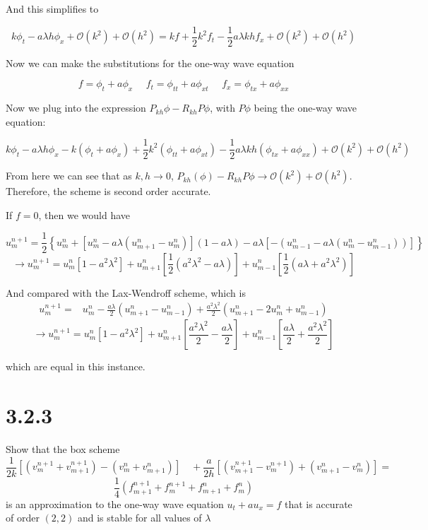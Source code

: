 \documentclass[12pt]{article}
\begin{document}
\noindent And this simplifies to

$$  k\phi_t - a\lambda h\phi_{x} + \mathcal{O}(k^2) + \mathcal{O}(h^2)= kf + \frac{1}{2}k^2f_t  - \frac{1}{2}a\lambda khf_x  + \mathcal{O}(k^2) + \mathcal{O}(h^2)$$

\noindent Now we can make the substitutions for the one-way wave equation

$$ f = \phi_t + a\phi_x ~~~~~~ f_t = \phi_{tt} + a\phi_{xt} ~~~~~~  f_x = \phi_{tx} + a\phi_{xx} $$

\noindent Now we plug into the expression $P_{kh}\phi - R_{kh}P\phi$, with $P\phi$ being the one-way wave equation:

$$  k\phi_t - a\lambda h\phi_{x} - k(\phi_t + a\phi_x) + \frac{1}{2}k^2(\phi_{tt} + a\phi_{xt})  - \frac{1}{2}a\lambda kh(\phi_{tx} + a\phi_{xx})  + \mathcal{O}(k^2) + \mathcal{O}(h^2)$$

\noindent From here we can see that as $k,h\to 0$, $P_{kh}(\phi) - R_{kh}P\phi\to \mathcal{O}(k^2) + \mathcal{O}(h^2)$. Therefore, the scheme is second order accurate.

If $f=0$, then we would have 

$$
u_{m}^{n+1}=\frac{1}{2}\left\{u_{m}^{n}+\left[u_{m}^{n}-a \lambda(u_{m+1}^{n}-u_{m}^{n})\right]   (1 - a\lambda)  -a \lambda\left[-(u_{m-1}^{n}-a \lambda(u_{m}^{n}-u_{m-1}^{n}))\right]\right\} 
$$
$$\longrightarrow u_m^{n+1} = 
    u_{m}^{n}\left[1-a^2\lambda^2\right] + 
    u_{m+1}^{n}\left[\frac{1}{2}(a^2\lambda^2 -a\lambda)\right] + 
    u_{m-1}^{n}\left[\frac{1}{2}(a\lambda + a^2\lambda^2)\right]  $$


\noindent And compared with the Lax-Wendroff scheme, which is
$$
\begin{aligned}
u_{m}^{n+1}=& u_{m}^{n}-\frac{a \lambda}{2}\left(u_{m+1}^{n}-u_{m-1}^{n}\right)+\frac{a^{2} \lambda^{2}}{2}\left(u_{m+1}^{n}-2 u_{m}^{n}+u_{m-1}^{n}\right)
\end{aligned}
$$
$$\longrightarrow u_m^{n+1} = u_m^n\left[1-a^2\lambda^2\right] + u_{m+1}^n\left[\frac{a^2\lambda^2}{2} - \frac{a\lambda}{2}\right] + u_{m-1}^n\left[\frac{a\lambda}{2} + \frac{a^2\lambda^2}{2}\right] $$

\noindent which are equal in this instance.

\section*{3.2.3}
Show that the box scheme
$$
\frac{1}{2 k}\left[\left(v_{m}^{n+1}+v_{m+1}^{n+1}\right)-\left(v_{m}^{n}+v_{m+1}^{n}\right)\right]
\quad+\frac{a}{2 h}\left[\left(v_{m+1}^{n+1}-v_{m}^{n+1}\right)+\left(v_{m+1}^{n}-v_{m}^{n}\right)\right]
=$$
$$\frac{1}{4}\left(f_{m+1}^{n+1}+f_{m}^{n+1}+f_{m+1}^{n}+f_{m}^{n}\right)$$
is an approximation to the one-way wave equation $u_{t}+a u_{x}=f$ that is accurate of order $(2,2)$ and is stable for all values of $\lambda$
\end{document}
